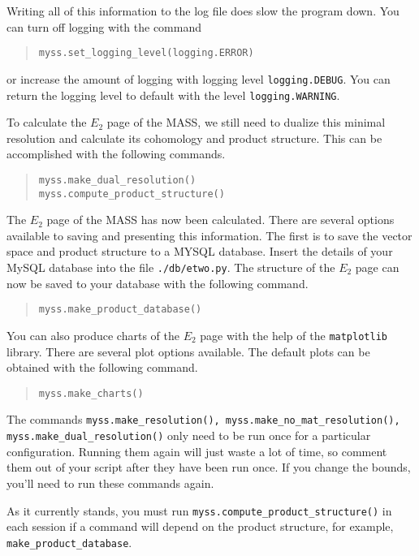\documentclass{article}
\begin{document}
Writing all of this information to the log file does slow the program
down. You can turn off logging with the command
\begin{quote}
\texttt{myss.set\_logging\_level(logging.ERROR)}
\end{quote}
or increase the amount of logging with logging level
\texttt{logging.DEBUG}. You can return the logging level to default
with the level \texttt{logging.WARNING}.

To calculate the $E_2$ page of the MASS, we still need to dualize this
minimal resolution and calculate its cohomology and product structure.
This can be accomplished with the following commands. 
\begin{quote}
\begin{verbatim}
myss.make_dual_resolution()
myss.compute_product_structure()
\end{verbatim}
\end{quote}
The $E_2$ page of the MASS has now been calculated. There are several
options available to saving and presenting this information. The first
is to save the vector space and product structure to a MYSQL
database. Insert the details of your MySQL database into the file
\texttt{./db/etwo.py}. The structure of the $E_2$ page can now be
saved to your database with the
following command.
\begin{quote}
\begin{verbatim}
myss.make_product_database()
\end{verbatim}
\end{quote}

You can also produce charts of the $E_2$ page with the help of the
\texttt{matplotlib} library. There are several plot options available.
The default plots can be obtained with the following command.
\begin{quote}
\begin{verbatim}
myss.make_charts()
\end{verbatim}
\end{quote}

The commands \texttt{myss.make\_resolution(),
  myss.make\_no\_mat\_resolution(), myss.make\_dual\_resolution()}
only need to be run once for a particular configuration. Running them
again will just waste a lot of time, so comment them out of your
script after they have been run once. If you change the bounds, you'll
need to run these commands again.

As it currently stands, you must run
\texttt{myss.compute\_product\_structure()} in each session if a
command will depend on the product structure, for example,
\texttt{make\_product\_database}.
\end{document}
